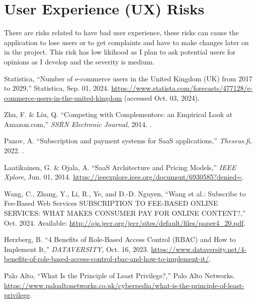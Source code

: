 \documentclass[]{project_report}
\begin{document}
\section{User Experience (UX) Risks}
There are risks related to have bad user experience, these risks can cause the application to lose users or to get complaints and have to make changes later on in the project. This risk has low likihood as I plan to ask potential users for opinions as I develop and the severity is medium.

\newpage

\begin{thebibliography}{99}


Statistica, “Number of e-commerce users in the United Kingdom (UK) from 2017 to 2029,” Statistica, Sep. 01, 2024. \url{https://www.statista.com/forecasts/477128/e-commerce-users-in-the-united-kingdom} (accessed Oct. 03, 2024).

Zhu, F. \& Liu, Q. “Competing with Complementors: an Empirical Look at Amazon.com,” \emph{SSRN Electronic Journal}, 2014. .

Panov, A. “Subscription and payment systems for SaaS applications,” \emph{Theseus.fi}, 2022. .

Laatikainen, G. \& Ojala, A. “SaaS Architecture and Pricing Models,” \emph{IEEE Xplore}, Jun. 01, 2014. \url{https://ieeexplore.ieee.org/document/6930585?denied=}.

Wang, C., Zhang, Y., Li, R., Ye, and D.-D. Nguyen, “Wang et al.: Subscribe to Fee-Based Web Services SUBSCRIPTION TO FEE-BASED ONLINE SERVICES: WHAT MAKES CONSUMER PAY FOR ONLINE CONTENT?,” Oct. 2024. Available: \url{http://ojs.jecr.org/jecr/sites/default/files/paper4_20.pdf}.

Herzberg, B. “4 Benefits of Role-Based Access Control (RBAC) and How to Implement It,” \emph{DATAVERSITY}, Oct. 16, 2023. \url{https://www.dataversity.net/4-benefits-of-role-based-access-control-rbac-and-how-to-implement-it/}.

Palo Alto, “What Is the Principle of Least Privilege?,” Palo Alto Networks. \url{https://www.paloaltonetworks.co.uk/cyberpedia/what-is-the-principle-of-least-privilege}.


\end{thebibliography}
\end{document}
